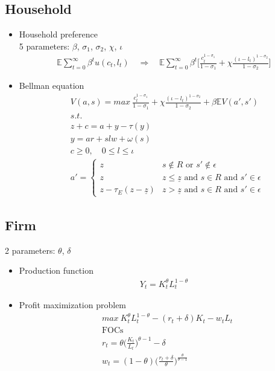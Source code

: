 \documentclass{article}
\begin{document}
\begin{spacing}{1.5}
\subsection{Household}
\begin{itemize}
\item Household preference\\
5 parameters: $\beta$, $\sigma_1$, $\sigma_2$, $\chi$, $\iota$
\begin{align*}
\mathbb{E}\sum_{t=0}^{\infty}\beta^tu(c_t,l_t)\quad\Rightarrow\quad\mathbb{E}\sum_{t=0}^{\infty}\beta^t\big[\frac{c^{1-\sigma_1}_t}{1-\sigma_1}+\chi\frac{(\iota-l_t)^{1-\sigma_2}}{1-\sigma_2}\big]
\end{align*}
\item Bellman equation
\begin{align*}
&V(a,s)=max \ \frac{c^{1-\sigma_1}_t}{1-\sigma_1}+\chi\frac{(\iota-l_t)^{1-\sigma_2}}{1-\sigma_2}+\beta\mathbb{E}V(a',s')\\
&s.t.\\
&z+c=a+y-\tau(y)\\
&y=ar+slw+\omega(s)\\
&c\geq 0, \quad 0\leq l\leq \iota\\
&a'=\left\{\begin{array}{cc} z & s\not\in R\text{ or } s'\not\in\epsilon\\ z & z\leq\underline{z}\text{ and }s\in R\text{ and }s'\in\epsilon\\ z-\tau_E(z-\underline{z}) & z>\underline{z}\text{ and }s\in R\text{ and }s'\in\epsilon \end{array} \right.
\end{align*}
\end{itemize}


\subsection{Firm}
2 parameters: $\theta$, $\delta$
\begin{itemize}
\item Production function
\begin{align*}
Y_t=K_t^{\theta}L_t^{1-\theta}
\end{align*}
\item Profit maximization problem
\begin{align*}
&max \ K_t^{\theta}L_t^{1-\theta}-(r_t+\delta)K_t-w_tL_t\\
&\text{FOCs}\\
&r_t=\theta\big(\frac{K_t}{L_t}\big)^{\theta-1}-\delta\\
&w_t=(1-\theta)\big(\frac{r_t+\delta}{\theta}\big)^{\frac{\theta}{\theta-1}}\\
\end{align*}
\end{itemize}



\end{spacing}
\end{document}
